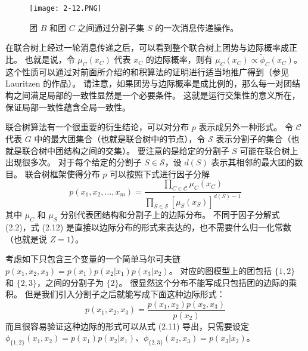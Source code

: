 \begin{figure}[htbp]
    \centering
    \texttt{[image: 2-12.PNG]}
    \caption{
        团 $B$ 和团 $C$ 之间通过分割子集 $S$ 的一次消息传递操作。
    }\label{fig:2-12}
\end{figure}

在联合树上经过一轮消息传递之后，可以看到整个联合树上团势与边际概率成正比。
也就是说，令 $\mu_C(x_C)$ 代表 $x_C$ 的边际概率，则有 $\mu_C(x_C) \propto \widetilde{\phi}_C(x_C)$。
这个性质可以通过对前面所介绍的和积算法的证明进行适当地推广得到（参见 Lauritzen 的作品）。
请注意，如果团势与边际概率是成比例的，那么每一对团结构之间满足局部的一致性显然是一个必要条件。
这就是运行交集性的意义所在，保证局部一致性蕴含全局一致性。

联合树算法有一个很重要的衍生结论，可以对分布 $p$ 表示成另外一种形式。
令 $\mathcal{C}$ 代表 $\widetilde{G}$ 中的最大团集合（也就是联合树中的节点），令 $\mathcal{S}$ 表示分割子的集合（也就是联合树中团结构之间的交集）。
要注意的是给定的分割子 $S$ 可能在联合树上出现很多次。
对于每个给定的分割子 $S \in \mathcal{S}$，设 $d(S)$ 表示其相邻的最大团的数目。
联合树框架使得分布 $p$ 可以按照下式进行因子分解
\begin{equation}
    p(x_1, x_2, \dots, x_m) = \frac{\prod_{C \in \mathcal{C}}\mu_C(x_C)}{\prod_{S \in \mathcal{S}}[\mu_S(x_S)]^{d(S)-1}}
\end{equation}
其中 $\mu_C$ 和 $\mu_S$ 分别代表团结构和分割子上的边际分布。
不同于因子分解式 (2.2)，式 (2.12) 是直接以边际分布的形式来表达的，也不需要什么归一化常数（也就是说 $Z = 1$）。

\begin{tcolorbox}
\begin{exam}[马尔可夫链]
    考虑如下只包含三个变量的一个简单马尔可夫链 $p(x_1, x_2, x_3) = p(x_1)p(x_2|x_1)p(x_3|x_2)$。
    对应的图模型上的团包括 $\{1, 2\}$ 和 $\{2, 3\}$，之间的分割子为 $\{2\}$。
    很显然这个分布不能写成只包括团的边际的乘积。
    但是我们引入分割子之后就能写成下面这种边际形式：
    \[p(x_1, x_2, x_3) = \frac{p(x_1, x_2)p(x_2, x_3)}{p(x_2)}\]
    而且很容易验证这种边际的形式可以从式 (2.11) 导出，只需要设定 $\phi_{\{1, 2\}}(x_1, x_2) = p(x_1)p(x_2|x_1)$、$\phi_{\{2, 3\}}(x_2, x_3) = p(x_3|x_2)$。
\end{exam}
\end{tcolorbox}

